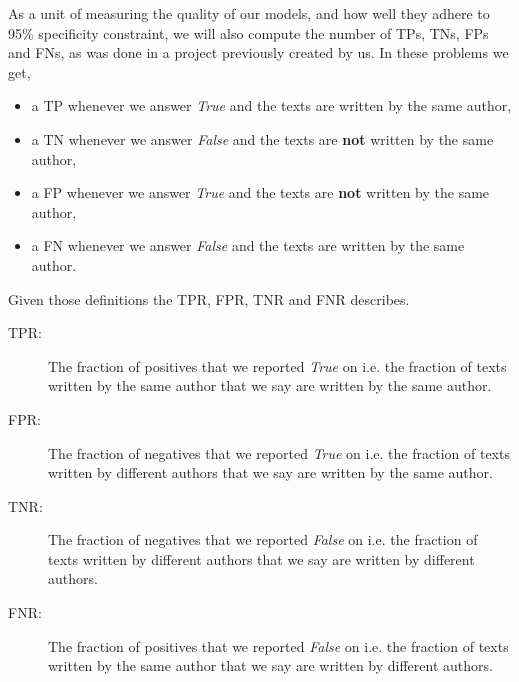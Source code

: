 As a unit of measuring the quality of our models, and how well they adhere to
95\% specificity constraint, we will also compute the number of \gls{TP}s,
\gls{TN}s, \gls{FP}s and \gls{FN}s, as was done in a project previously created
by us.\cite{US} In these problems we get,

\begin{itemize}
    \item a \gls{TP} whenever we answer \textit{True} and the texts are written
        by the same author,
    \item a \gls{TN} whenever we answer \textit{False} and the texts are
        \textbf{not} written by the same author,
    \item a \gls{FP} whenever we answer \textit{True} and the texts are
        \textbf{not} written by the same author,
    \item a \gls{FN} whenever we answer \textit{False} and the texts are written
        by the same author.
\end{itemize}

Given those definitions the \gls{TPR}, \gls{FPR}, \gls{TNR} and \gls{FNR}
describes.

\begin{description}
    \item[\gls{TPR}: ]

        The fraction of positives that we reported \textit{True} on i.e. the
        fraction of texts written by the same author that we say are written by
        the same author.

    \item[\gls{FPR}: ]

        The fraction of negatives that we reported \textit{True} on i.e. the
        fraction of texts written by different authors that we say are written
        by the same author.

    \item[\gls{TNR}: ]

        The fraction of negatives that we reported \textit{False} on i.e. the
        fraction of texts written by different authors that we say are written
        by different authors.

    \item[\gls{FNR}: ]

        The fraction of positives that we reported \textit{False} on i.e. the
        fraction of texts written by the same author that we say are written by
        different authors.

\end{description}

